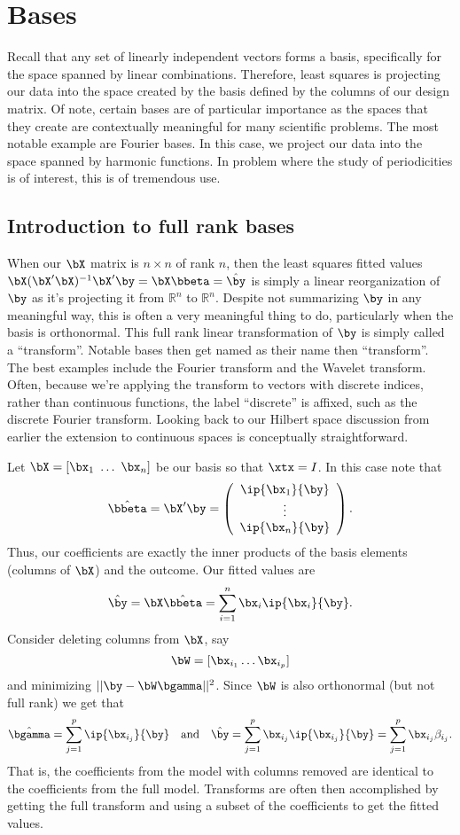 \section{Bases}


Recall that any set of linearly independent vectors forms a basis,
specifically for the space spanned by linear combinations. Therefore,
least squares is projecting our data into the space created by
the basis defined by the columns of our design matrix. Of note,
certain bases are of particular importance as the spaces that
they create are contextually meaningful for many scientific
problems. The most notable example are Fourier bases. In this
case, we project our data into the space spanned by harmonic
functions. In problem where the study of periodicities is 
of interest, this is of tremendous use.

\subsection{Introduction to full rank bases}


When our $\bX$ matrix is $n\times n$ of rank $n$, then the least squares
fitted values $\bX (\bX' \bX)^{-1} \bX' \by = \bX \bbeta = \hat \by$ is simply a linear reorganization
of $\by$ as it's projecting it from $\mathbb{R}^n$ to $\mathbb{R}^n$. 
Despite not summarizing $\by$ in any meaningful way, this is often
a very meaningful thing to do, particularly when the basis is orthonormal.
This full rank linear transformation of $\by$ is simply called a 
``transform''. Notable bases then get named as their name then ``transform''. 
The best examples include the Fourier transform and the Wavelet transform.
Often, because we're applying the transform to vectors with discrete
indices, rather than continuous functions, the label ``discrete'' is
affixed, such as the discrete Fourier transform. Looking back to
our Hilbert space discussion from earlier the extension to continuous
spaces is conceptually straightforward. 

Let $\bX = [\bx_1 ~ \ldots ~ \bx_n]$ be our basis so that 
$\xtx = I$. In this case note that 
$$
\hat \bbeta
= \bX' \by 
= 
\left(
\begin{array}{c}
 \ip{\bx_1}{\by} \\
 \vdots \\
 \ip{\bx_n}{\by}
\end{array}
\right).
$$
Thus, our coefficients are exactly the inner products of the basis elements (columns of $\bX$) and the outcome. Our fitted values are
$$
\hat \by = \bX \hat \bbeta = \sum_{i=1}^n \bx_i \ip{\bx_i}{\by}.
$$
Consider deleting columns from $\bX$, say 
$$
\bW = [\bx_{i_1} \ldots \bx_{i_p}]
$$
and minimizing $||\by - \bW \bgamma||^2$. Since $\bW$ is also orthonormal (but not full rank) we get that 
$$
\hat \bgamma = \sum_{j=1}^p \ip{\bx_{i_j}}{\by} ~~~
\mbox{and} ~~~
\hat \by = \sum_{j=1}^p \bx_{i_j} \ip{\bx_{i_j}}{\by}
=  \sum_{j=1}^p \bx_{i_j} \beta_{i_j}.
$$
That is, the coefficients from the model with columns removed are identical
to the coefficients from the full model. Transforms are often then
accomplished by getting the full transform and using a subset of the 
coefficients to get the fitted values. 


